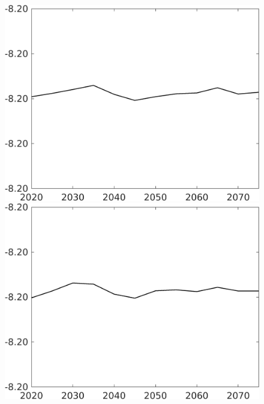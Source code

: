 \begin{figure}[h!!]
\begin{minipage}[]{0.32\textwidth}
	\end{minipage}	
	\begin{minipage}[]{0.32\textwidth}
	\includegraphics[width=1\textwidth]{../../codding_model/own_basedOnFried/optimalPol_010922_revision/figures/all_13Sept22/CompTaul_Equlab_LFBAUPer_Reg0_F_spillover0_nsk1_xgr1_knspil1_sep1_countec0_GovRev1_etaa0.79.png}
\end{minipage}	
\begin{minipage}[]{0.32\textwidth}
\includegraphics[width=1\textwidth]{../../codding_model/own_basedOnFried/optimalPol_010922_revision/figures/all_13Sept22/CompTaul_Equlab_LFBAUPer_Reg0_G_spillover0_nsk1_xgr1_knspil1_sep1_countec0_GovRev1_etaa0.79.png}

\end{minipage}
\end{figure}
